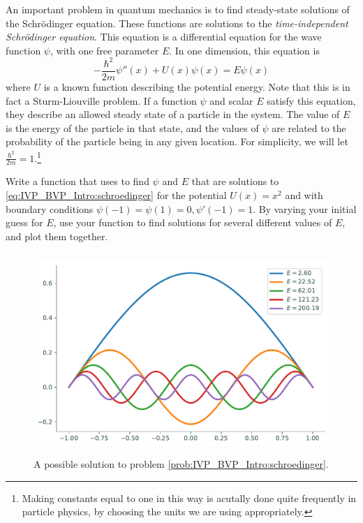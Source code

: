 \begin{problem}
\label{prob:IVP_BVP_Intro:schroedinger}
An important problem in quantum mechanics is to find steady-state solutions of the Schr\"odinger equation.
These functions are solutions to the \textit{time-independent Schr\"odinger equation}.
This equation is a differential equation for the wave function \(\psi\), with one free parameter \(E\).
In one dimension, this equation is
\begin{equation}
\label{eq:IVP_BVP_Intro:schroedinger}
-\frac{\hbar^2}{2m}\psi''(x)+U(x)\psi(x)=E\psi(x)
\end{equation}
where \(U\) is a known function describing the potential energy. 
Note that this is in fact a Sturm-Liouville problem.
If a function \(\psi\) and scalar \(E\) satisfy this equation, they describe an allowed steady state of a particle in the system.
The value of \(E\) is the energy of the particle in that state, and the values of \(\psi\) are related to the probability of the particle being in any given location.
For simplicity, we will let \(\frac{\hbar^2}{2m}=1\).\footnote{Making constants equal to one in this way is acutally done quite frequently in particle physics, by choosing the units we are using appropriately.}

Write a function that uses  to find \(\psi\) and \(E\) that are solutions to \eqref{eq:IVP_BVP_Intro:schroedinger} for the potential \(U(x)=x^2\) and with boundary conditions \(\psi(-1)=\psi(1)=0, \psi'(-1)=1\).
By varying your initial guess for \(E\), use your function to find solutions for several different values of \(E\), and plot them together.
\end{problem}

\begin{figure}[H]
    \label{fig:bvpintro:bvp5}
    \centering
    \includegraphics[height=3in]{figures/problem5.pdf}
    \caption{A possible solution to problem \ref{prob:IVP_BVP_Intro:schroedinger}.}
\end{figure}